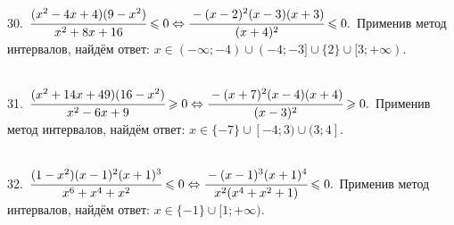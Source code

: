 \documentclass[12pt]{article}
\begin{document}
30. $\cfrac{(x^2-4x+4)(9-x^2)}{x^2+8x+16}\leqslant0\Leftrightarrow\cfrac{-(x-2)^2(x-3)(x+3)}{(x+4)^2}\leqslant0.$ Применив метод интервалов, найдём ответ: $x\in
(-\infty;-4)\cup(-4;-3]\cup\{2\}\cup[3;+\infty).$
\begin{figure}[ht!]
\end{figure}\\
31. $\cfrac{(x^2+14x+49)(16-x^2)}{x^2-6x+9}\geqslant0\Leftrightarrow\cfrac{-(x+7)^2(x-4)(x+4)}{(x-3)^2}\geqslant0.$ Применив метод интервалов, найдём ответ: $x\in
\{-7\}\cup[-4;3)\cup(3;4].$
\begin{figure}[ht!]
\end{figure}\\
32. $\cfrac{(1-x^2)(x-1)^2(x+1)^3}{x^6+x^4+x^2}\leqslant0\Leftrightarrow\cfrac{-(x-1)^3(x+1)^4}{x^2(x^4+x^2+1)}\leqslant0.$ Применив метод интервалов, найдём ответ: $x\in\{-1\}\cup[1;+\infty).$
\begin{figure}[ht!]
\end{figure}\\
\end{document}
